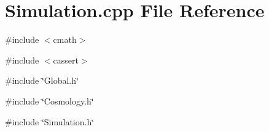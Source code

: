 \section{Simulation.cpp File Reference}
\label{Simulation_8cpp}
{\ttfamily \#include $<$cmath$>$}\par
{\ttfamily \#include $<$cassert$>$}\par
{\ttfamily \#include \char`\"{}Global.h\char`\"{}}\par
{\ttfamily \#include \char`\"{}Cosmology.h\char`\"{}}\par
{\ttfamily \#include \char`\"{}Simulation.h\char`\"{}}\par
